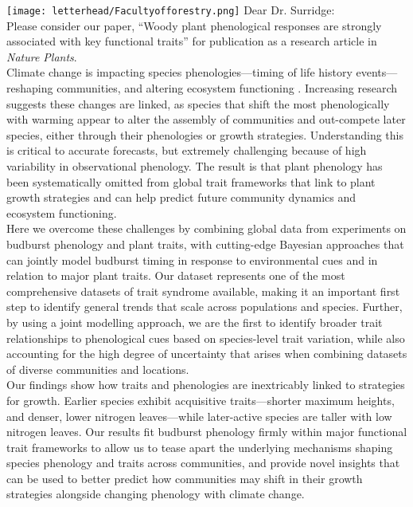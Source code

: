 \documentclass[11pt,a4paper]{article}
\begin{document}

\noindent \texttt{[image: letterhead/Facultyofforestry.png]}
\noindent Dear Dr. Surridge:
\vspace{1.5ex}\\
\noindent Please consider our paper, ``Woody plant phenological responses are strongly associated with key functional traits'' for publication as a research article in \emph{Nature Plants}. 
\vspace{1.5ex}\\ 

\noindent Climate change is impacting species phenologies---timing of life history events---reshaping communities, and altering ecosystem functioning \citep{Cleland2007a,Beard2019,Gu2022}. Increasing research suggests these changes are linked, as species that shift the most phenologically with warming appear to alter the assembly of communities and out-compete later species, either through their phenologies or growth strategies. Understanding this is critical to accurate forecasts, but extremely challenging because of high variability in observational phenology. The result is that plant phenology has been systematically omitted from global trait frameworks that link to plant growth strategies and can help predict future community dynamics and ecosystem functioning.
\vspace{1.5ex}\\
\noindent Here we overcome these challenges by combining global data from experiments on budburst phenology and plant traits, with cutting-edge Bayesian approaches that can jointly model budburst timing in response to environmental cues and in relation to major plant traits. Our dataset represents one of the most comprehensive datasets of trait syndrome available, making it an important first step to identify general trends that scale across populations and species. Further, by using a joint modelling approach, we are the first to identify broader trait relationships to phenological cues based on species-level trait variation, while also accounting for the high degree of uncertainty that arises when combining datasets of diverse communities and locations.
\vspace{1.5ex}\\
\noindent  Our findings show how traits and phenologies are inextricably linked to strategies for growth. Earlier species exhibit acquisitive traits---shorter maximum heights, and denser, lower nitrogen leaves---while later-active species are taller with low nitrogen leaves. Our results fit budburst phenology firmly within major functional trait frameworks to allow us to tease apart the underlying mechanisms shaping species phenology and traits across communities, and provide novel insights that can be used to better predict how communities may shift in their growth strategies alongside changing phenology with climate change. 
\end{document}
